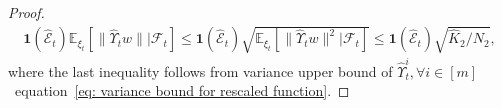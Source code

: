 \documentclass[twoside]{article} %
\def\eqref#1{equation~\ref{#1}}
\theoremstyle{plain}
\theoremstyle{definition}
\theoremstyle{remark}
\newcommand{\HGamma}{\hat{\Gamma}}
\newcommand{\HUpsilon}{\hat{\Upsilon}}
\newcommand{\hL}{\hat{L}}
\newcommand{\calhatE}{\mathcal{\hat{E}}}
\begin{document}
\begin{proof}
\begin{align}
    \mathbf{1}(\calhatE_t)\mathbb{E}_{\xi_t}[\|\HUpsilon_tw\||\mathcal{F}_t]\leq \mathbf{1}(\calhatE_t) \sqrt{\mathbb{E}_{\xi_t}[\|\HUpsilon_tw\|^2|\mathcal{F}_t]}\leq \mathbf{1}(\calhatE_t)\sqrt{\hat{K}_2/N_2},
    \label{eq: variance bound thm 3}
\end{align}
where the last inequality follows from variance upper bound of $\HUpsilon_t^i,\forall i\in[m]$~\eqref{eq: variance bound for rescaled function}.


\end{proof}
\end{document}
